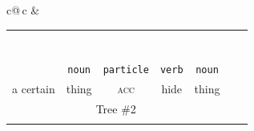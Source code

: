 \documentclass[a4paper,landscape,headrule,footrule,xetex]{foils}
\newcommand{\sa}[2]{\rnode{c#1}{\iz{#2}}}%
\begin{document}
{\begin{tabular}{c@{\,}c}
  &
  \begin{tabular}{ccccccc}
    &\multicolumn{5}{c}{\sa{1}{NP-frag}}  \\[1ex]
    &\multicolumn{5}{c}{\sa{2}{\wl{rel-clause}}}  \\[1ex]
    &\multicolumn{3}{c}{\sa{3}{hd-complement}} & \sa{4}{N} \\[1ex]
    \multicolumn{3}{c}{\sa{5}{hd-complement}} & \multicolumn{1}{c}{\sa{J}{\wl{subj-zpro}}} &
    \\[1ex]
    \multicolumn{2}{c}{\sa{I}{\ul{hd-specifier}}} & & \sa{K}{V} & & \\[1ex]
    \sa{H}{DET} & \sa{7}{N}      & \sa{8}{CASE-P} &   &  \\[1ex]
    \sa{G}{ある} & \sa{B}{物事} & \sa{C}{を} & \sa{D}{隠す} &  \sa{F}{ 物} \\
   \texttt{\emp{\ul{adnominal}}} & \texttt{noun} & \texttt{particle} & \texttt{verb} & \texttt{noun} \\
    a certain & thing &  \textsc{acc} & hide &  thing \\
   \multicolumn{5}{c}{Tree \#2} \\ \\
  \end{tabular}\\
  \centering
   
   
   
    
   
   
    



\end{tabular}}
\end{document}
